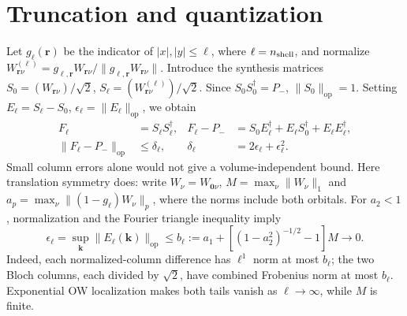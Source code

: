 \documentclass[aps,prb,onecolumn,nofootinbib,superscriptaddress]{revtex4-2}
\newcommand{\op}{\mathrm{op}}
\newcommand{\br}{\boldsymbol r}
\newcommand{\bk}{\boldsymbol k}
\begin{document}
\section{Truncation and quantization}
Let $g_\ell(\br)$ be the indicator of $|x|,|y|\le\ell$, where
$\ell=n_{\rm shell}$, and normalize
$W^{(\ell)}_{\br\nu}=g_{\ell,\br}W_{\br\nu}/\|g_{\ell,\br}W_{\br\nu}\|$.
Introduce the synthesis matrices
$S_0=(W_{\br\nu})/\sqrt2$, $S_\ell=(W^{(\ell)}_{\br\nu})/\sqrt2$.
Since $S_0S_0^\dagger=P_-$, $\|S_0\|_\op=1$. Setting
$E_\ell=S_\ell-S_0$, $\epsilon_\ell=\|E_\ell\|_\op$, we obtain
\begin{align}
 F_\ell&=S_\ell S_\ell^\dagger,
 &F_\ell-P_-&=S_0E_\ell^\dagger+E_\ell S_0^\dagger+E_\ell E_\ell^\dagger,
 \nonumber\\[-2pt]
 \|F_\ell-P_-\|_\op&\le\delta_\ell,
 &\delta_\ell&=2\epsilon_\ell+\epsilon_\ell^2. \label{eq:bound}
\end{align}
Small column errors alone would not give a volume-independent bound.
Here translation symmetry does: write $W_\nu=W_{\boldsymbol0\nu}$,
$M=\max_\nu\|W_\nu\|_1$ and
$a_p=\max_\nu\|(1-g_\ell)W_\nu\|_p$, where the norms include both orbitals.
For $a_2<1$, normalization and the Fourier triangle inequality imply
\begin{equation}
 \epsilon_\ell=\sup_{\bk}\|E_\ell(\bk)\|_\op
 \le b_\ell:=a_1+
 \left[(1-a_2^2)^{-1/2}-1\right]M\longrightarrow0 . \label{eq:tail}
\end{equation}
Indeed, each normalized-column difference has $\ell^1$ norm at most
$b_\ell$; the two Bloch columns, each divided by $\sqrt2$, have combined
Frobenius norm at most $b_\ell$. Exponential OW localization makes both tails
vanish as $\ell\to\infty$, while $M$ is finite.
\end{document}
